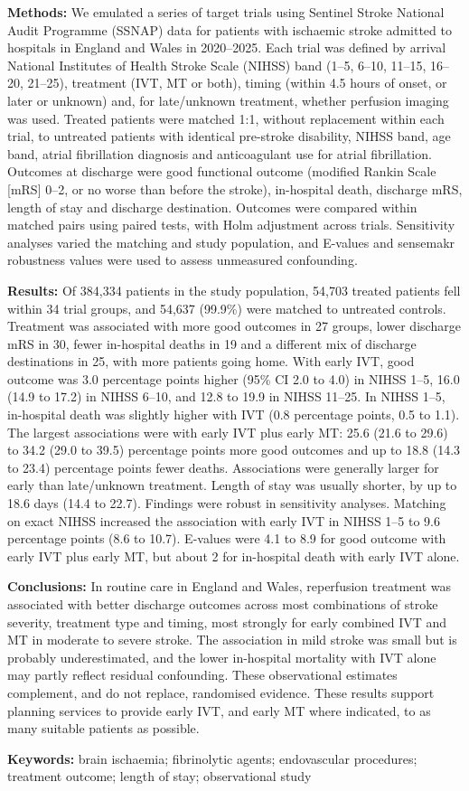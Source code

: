 \textbf{Methods:} We emulated a series of target trials using Sentinel Stroke National Audit Programme (SSNAP) data for patients with ischaemic stroke admitted to hospitals in England and Wales in 2020--2025. Each trial was defined by arrival National Institutes of Health Stroke Scale (NIHSS) band (1--5, 6--10, 11--15, 16--20, 21--25), treatment (IVT, MT or both), timing (within 4.5 hours of onset, or later or unknown) and, for late/unknown treatment, whether perfusion imaging was used. Treated patients were matched 1:1, without replacement within each trial, to untreated patients with identical pre-stroke disability, NIHSS band, age band, atrial fibrillation diagnosis and anticoagulant use for atrial fibrillation. Outcomes at discharge were good functional outcome (modified Rankin Scale [mRS] 0--2, or no worse than before the stroke), in-hospital death, discharge mRS, length of stay and discharge destination. Outcomes were compared within matched pairs using paired tests, with Holm adjustment across trials. Sensitivity analyses varied the matching and study population, and E-values and sensemakr robustness values were used to assess unmeasured confounding.

\textbf{Results:} Of 384,334 patients in the study population, 54,703 treated patients fell within 34 trial groups, and 54,637 (99.9\%) were matched to untreated controls. Treatment was associated with more good outcomes in 27 groups, lower discharge mRS in 30, fewer in-hospital deaths in 19 and a different mix of discharge destinations in 25, with more patients going home. With early IVT, good outcome was 3.0 percentage points higher (95\% CI 2.0 to 4.0) in NIHSS 1--5, 16.0 (14.9 to 17.2) in NIHSS 6--10, and 12.8 to 19.9 in NIHSS 11--25. In NIHSS 1--5, in-hospital death was slightly higher with IVT (0.8 percentage points, 0.5 to 1.1). The largest associations were with early IVT plus early MT: 25.6 (21.6 to 29.6) to 34.2 (29.0 to 39.5) percentage points more good outcomes and up to 18.8 (14.3 to 23.4) percentage points fewer deaths. Associations were generally larger for early than late/unknown treatment. Length of stay was usually shorter, by up to 18.6 days (14.4 to 22.7). Findings were robust in sensitivity analyses. Matching on exact NIHSS increased the association with early IVT in NIHSS 1--5 to 9.6 percentage points (8.6 to 10.7). E-values were 4.1 to 8.9 for good outcome with early IVT plus early MT, but about 2 for in-hospital death with early IVT alone.

\textbf{Conclusions:} In routine care in England and Wales, reperfusion treatment was associated with better discharge outcomes across most combinations of stroke severity, treatment type and timing, most strongly for early combined IVT and MT in moderate to severe stroke. The association in mild stroke was small but is probably underestimated, and the lower in-hospital mortality with IVT alone may partly reflect residual confounding. These observational estimates complement, and do not replace, randomised evidence. These results support planning services to provide early IVT, and early MT where indicated, to as many suitable patients as possible.

\fi

\noindent\textbf{Keywords:} brain ischaemia; fibrinolytic agents; endovascular procedures; treatment outcome; length of stay; observational study


